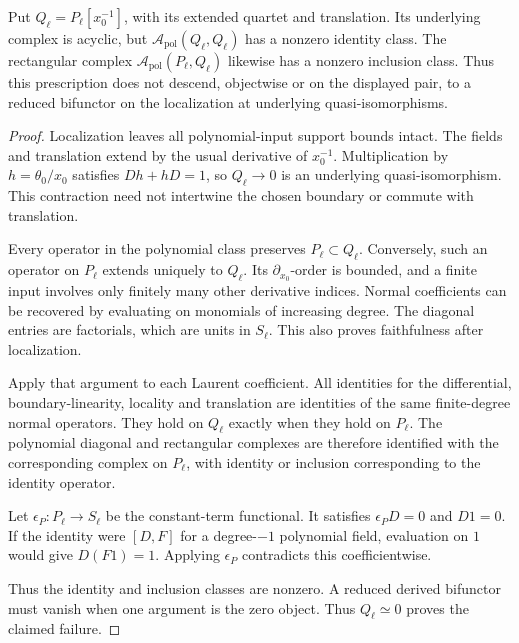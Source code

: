 \begin{proposition}\label{mht:prop:ramond-local-descent}
Put $Q_\ell=P_\ell[x_0^{-1}]$, with its extended quartet
and translation. Its underlying complex is acyclic,
but $\mathcal A_{\mathrm{pol}}(Q_\ell,Q_\ell)$ has a
nonzero identity class. The rectangular complex
$\mathcal A_{\mathrm{pol}}(P_\ell,Q_\ell)$ likewise has
a nonzero inclusion class. Thus this prescription does
not descend, objectwise or on the displayed pair, to a
reduced bifunctor on the localization at underlying
quasi-isomorphisms.
\end{proposition}

\begin{proof}
Localization leaves all polynomial-input support bounds
intact. The fields and translation extend by the usual
derivative of $x_0^{-1}$. Multiplication by
$h=\theta_0/x_0$ satisfies
$Dh+hD=1$, so $Q_\ell\to0$ is an underlying
quasi-isomorphism. This contraction need not intertwine
the chosen boundary or commute with translation.

Every operator in the polynomial class preserves
$P_\ell\subset Q_\ell$. Conversely, such an operator
on $P_\ell$ extends uniquely to $Q_\ell$. Its
$\partial_{x_0}$-order is bounded, and a finite input
involves only finitely many other derivative indices.
Normal coefficients can be recovered by evaluating on
monomials of increasing degree. The diagonal entries
are factorials, which are units in $S_\ell$.
This also proves faithfulness after localization.

Apply that argument to each Laurent coefficient. All
identities for the differential, boundary-linearity,
locality and translation are identities of the same
finite-degree normal operators. They hold on $Q_\ell$
exactly when they hold on $P_\ell$. The polynomial
diagonal and rectangular complexes are therefore
identified with the corresponding complex on
$P_\ell$, with identity or inclusion corresponding to
the identity operator.

Let $\epsilon_P:P_\ell\to S_\ell$ be the constant-term
functional. It satisfies $\epsilon_PD=0$ and $D1=0$.
If the identity were $[D,F]$ for a degree-$-1$
polynomial field, evaluation on $1$ would give
$D(F1)=1$. Applying $\epsilon_P$ contradicts this
coefficientwise.

Thus the identity and inclusion
classes are nonzero. A reduced derived bifunctor
must vanish when one argument is the zero object.
Thus $Q_\ell\simeq0$ proves the claimed failure.
\end{proof}

